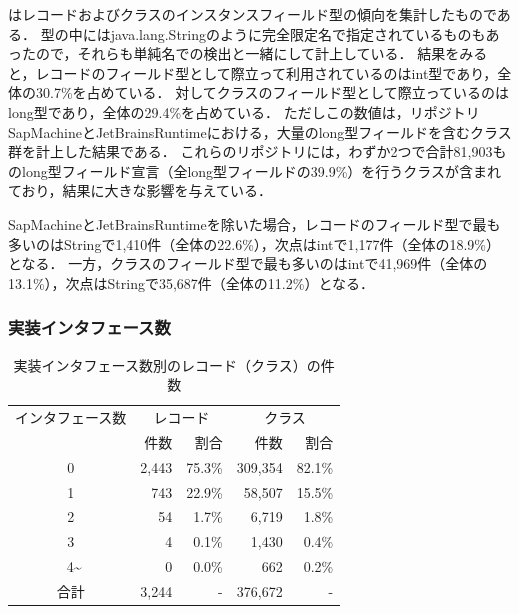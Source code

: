 はレコードおよびクラスのインスタンスフィールド型の傾向を集計したものである．
型の中にはjava.lang.Stringのように完全限定名で指定されているものもあったので，それらも単純名での検出と一緒にして計上している．
結果をみると，レコードのフィールド型として際立って利用されているのはint型であり，全体の30.7\%を占めている．
対してクラスのフィールド型として際立っているのはlong型であり，全体の29.4\%を占めている．
ただしこの数値は，リポジトリSapMachineとJetBrainsRuntimeにおける，大量のlong型フィールドを含むクラス群を計上した結果である．
これらのリポジトリには，わずか2つで合計81,903ものlong型フィールド宣言（全long型フィールドの39.9\%）を行うクラスが含まれており，結果に大きな影響を与えている．

SapMachineとJetBrainsRuntimeを除いた場合，レコードのフィールド型で最も多いのはStringで1,410件（全体の22.6\%），次点はintで1,177件（全体の18.9\%）となる．
一方，クラスのフィールド型で最も多いのはintで41,969件（全体の13.1\%），次点はStringで35,687件（全体の11.2\%）となる．



\subsubsection{実装インタフェース数\label{num_implemented_interfaces}}

\begin{table}[t]
    \caption{実装インタフェース数別のレコード（クラス）の件数}
    \label{num_interfaces}
    \centering
    \begin{tabular}{c||r|r|r|r}
        \hline
        インタフェース数 & \multicolumn{2}{c|}{レコード} & \multicolumn{2}{c}{クラス}\\
         & 件数 & 割合 & 件数 & 割合\\
        \hline\hline
        0 & 2,443 & 75.3\% & 309,354 & 82.1\%\\
        1 & 743 & 22.9\% & 58,507 & 15.5\%\\
        2 & 54 & 1.7\% & 6,719 & 1.8\%\\
        3 & 4 & 0.1\% & 1,430 & 0.4\%\\\
        4\textasciitilde & 0 & 0.0\% & 662 & 0.2\%\\
        \hline
        合計 & 3,244 & - & 376,672 & - \\
        \hline
    \end{tabular}
\end{table}


